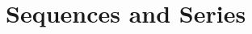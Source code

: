 \documentclass[12pt, oneside]{book}
\begin{document}







	




% 


\chapter{Sequences and Series}\label{sequences and series}
\vspace*{-0.25in}




\end{document}
